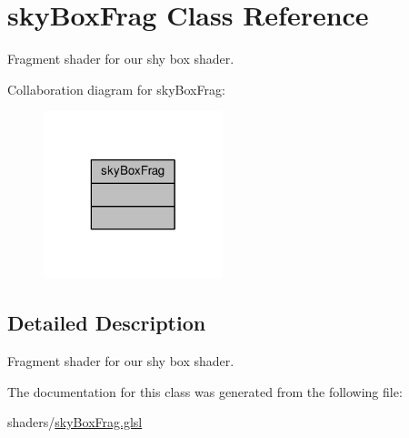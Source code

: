 \hypertarget{classsky_box_frag}{\section{sky\-Box\-Frag Class Reference}
\label{classsky_box_frag}
}


Fragment shader for our shy box shader.  




Collaboration diagram for sky\-Box\-Frag\-:\nopagebreak
\begin{figure}[H]
\begin{center}
\leavevmode
\includegraphics[width=148pt]{classsky_box_frag__coll__graph}
\end{center}
\end{figure}


\subsection{Detailed Description}
Fragment shader for our shy box shader. 

The documentation for this class was generated from the following file\-:\begin{DoxyCompactItemize}
\item 
shaders/\hyperlink{sky_box_frag_8glsl}{sky\-Box\-Frag.\-glsl}\end{DoxyCompactItemize}
